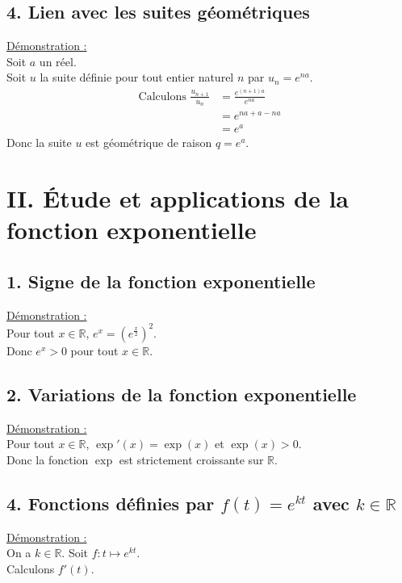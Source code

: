 \documentclass[11pt,a4paper]{article}
\begin{document}
\subsection*{4. Lien avec les suites géométriques}

\underline{Démonstration :}  \\
Soit $a$ un réel. \\
Soit $u$ la suite définie pour tout entier naturel $n$ par $u_n=e^{na}$.
\vspace{-4pt} 
\begin{align*}
    \text{Calculons }\frac{u_{n+1}}{u_n}&=\frac{e^{(n+1)a}}{e^{na}} \\
    &=e^{na+a-na} \\
    &=e^a
\end{align*}
Donc la suite $u$ est géométrique de raison $q=e^{a}$.


\section*{II. Étude et applications de la fonction exponentielle}

\subsection*{1. Signe de la fonction exponentielle}

\underline{Démonstration :}  \\
Pour tout $x\in\mathbb{R}$, $e^x=(e^{\frac{x}{2}})^2$. \\
Donc $e^x>0$ pour tout $x\in\mathbb{R}$.

\subsection*{2. Variations de la fonction exponentielle}

\underline{Démonstration :}  \\
Pour tout $x\in\mathbb{R}$, $\exp'(x)=\exp(x)$ et $\exp(x)>0$. \\
Donc la fonction $\exp$ est strictement croissante sur $\mathbb{R}$.


\subsection*{4. Fonctions définies par $f(t)=e^{kt}$ avec $k\in\mathbb{R}$}

\underline{Démonstration :}  \\
On a $k\in\mathbb{R}$. Soit $f:t\mapsto e^{kt}$. \\
Calculons $f'(t)$. \\
\end{document}
